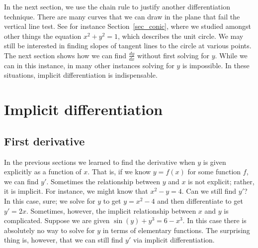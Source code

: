 \ifcourse

In the next section, we use the chain rule to justify another differentiation technique. There are many curves that we can draw in the plane that fail the vertical line test. See for instance Section~\ref{sec_conic}, where we studied amongst other things the equation $x^2+y^2=1$, which describes the unit circle. We may still be interested in finding slopes of tangent lines to the circle at various points. The next section shows how we can find $\frac{dy}{dx}$ without first solving for $y$.  While we can in this instance, in many other instances solving for $y$ is impossible. In these situations, implicit differentiation is indispensable. 
\fi



\ifcourse
\section{Implicit differentiation}\label{sec:imp_deriv}

\subsection{First derivative}
	\checkoddpage
{}

In the previous sections we learned to find the derivative when $y$ is given explicitly as a function of $x$. That is, if we know $y=f(x)$ for some function $f$, we can find $y'$. Sometimes the relationship between $y$ and $x$ is not explicit; rather, it is implicit. For instance, we might know that $x^2-y=4$.  Can we still find $y'$?  In this case, sure; we  solve for $y$ to get $y=x^2-4$  and then differentiate to get $y'=2x$. Sometimes, however, the implicit relationship between $x$ and $y$ is complicated.  Suppose we are given $\sin(y)+y^3=6-x^3$.  In this case there is absolutely no way to solve for $y$ in terms of elementary functions.  The surprising thing is, however, that we can still find $y'$ via implicit differentiation.

